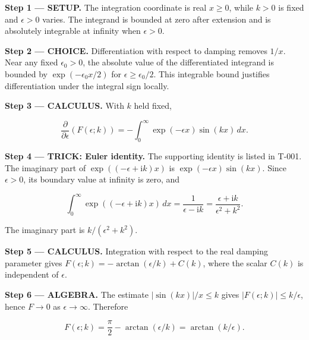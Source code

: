\documentclass[11pt,oneside,openany]{book}
\begin{document}
\textbf{Step 1 --- SETUP.} The integration coordinate is real \(x\ge0\), while \(k>0\) is fixed and \(\epsilon>0\) varies. The integrand is bounded at zero after extension and is absolutely integrable at infinity when \(\epsilon>0\).

\begin{ChoiceStep}
\textbf{Step 2 --- CHOICE.} Differentiation with respect to damping removes \(1/x\). Near any fixed \(\epsilon_0>0\), the absolute value of the differentiated integrand is bounded by \(\exp(-\epsilon_0x/2)\) for \(\epsilon\ge\epsilon_0/2\). This integrable bound justifies differentiation under the integral sign locally.

\end{ChoiceStep}
\textbf{Step 3 --- CALCULUS.} With \(k\) held fixed,

\[
\frac{\partial}{\partial\epsilon}\left(F(\epsilon;k)\right)
=-\int_0^\infty\exp(-\epsilon x)\sin(kx)\,dx.
\]

\begingroup\color{TrickPurple}
\textbf{Step 4 --- TRICK: Euler identity.} The supporting identity is listed in T-001. The imaginary part of \(\exp((-\epsilon+\mathrm{i}k)x)\) is \(\exp(-\epsilon x)\sin(kx)\). Since \(\epsilon>0\), its boundary value at infinity is zero, and

\[
\int_0^\infty\exp((-\epsilon+\mathrm{i}k)x)\,dx
=\frac{1}{\epsilon-\mathrm{i}k}
=\frac{\epsilon+\mathrm{i}k}{\epsilon^2+k^2}.
\]

The imaginary part is \(k/(\epsilon^2+k^2)\).

\endgroup
\textbf{Step 5 --- CALCULUS.} Integration with respect to the real damping parameter gives \(F(\epsilon;k)=-\arctan(\epsilon/k)+C(k)\), where the scalar \(C(k)\) is independent of \(\epsilon\).

\begingroup\color{AlgebraBlue}
\textbf{Step 6 --- ALGEBRA.} The estimate \(|\sin(kx)|/x\le k\) gives \(|F(\epsilon;k)|\le k/\epsilon\), hence \(F\to0\) as \(\epsilon\to\infty\). Therefore

\[
F(\epsilon;k)=\frac{\pi}{2}-\arctan(\epsilon/k)=\arctan(k/\epsilon).
\]
\end{document}
